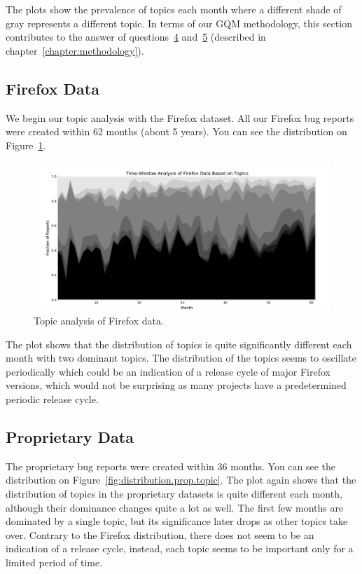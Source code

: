 The plots show the prevalence of topics each month where a different shade of gray represents a different topic. In terms of our GQM methodology, this section contributes to the answer of questions~\hyperlink{question:4}{4} and~\hyperlink{question:5}{5} (described in chapter~\ref{chapter:methodology}).

\subsection{Firefox Data}

We begin our topic analysis with the Firefox dataset. All our Firefox bug reports were created within 62 months (about 5 years). You can see the distribution on Figure~\ref{fig:distribution.firefox.topic}.

\begin{figure}[htbp]
    \centering
        \includegraphics[width=\textwidth]{./images/topic_component_distribution/firefox_topic_10.pdf}
    \caption{Topic analysis of Firefox data.}
    \label{fig:distribution.firefox.topic}
\end{figure}

The plot shows that the distribution of topics is quite significantly different each month with two dominant topics. The distribution of the topics seems to oscillate periodically which could be an indication of a release cycle of major Firefox versions, which would not be surprising as many projects have a predetermined periodic release cycle.

\subsection{Proprietary Data}

The proprietary bug reports were created within 36 months. You can see the distribution on Figure~\ref{fig:distribution.prop.topic}. The plot again shows that the distribution of topics in the proprietary datasets is quite different each month, although their dominance changes quite a lot as well. The first few months are dominated by a single topic, but its significance later drops as other topics take over. Contrary to the Firefox distribution, there does not seem to be an indication of a release cycle, instead, each topic seems to be important only for a limited period of time.

